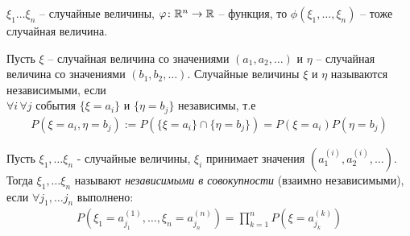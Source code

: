 \begin{remark}
	$\xi_1 \ldots \xi_n$ -- случайные величины, $\varphi\colon \mathbb{R}^n \to \mathbb{R}$ -- функция, 
	то $\phi(\xi_1, \ldots, \xi_n)$ -- тоже случайная величина.
\end{remark}

\begin{definition}
	Пусть $\xi$ -- случайная величина со значениями $(a_1, a_2, \ldots )$ и 
	$\eta$ -- случайная величина со значениями $(b_1, b_2, \ldots)$. 
	Случайные величины $\xi$ и $\eta$ называются независимыми, если\\
	$\forall i \, \forall j$ события $\{ \xi = a_i \}$ и  $\{ \eta = b_j \}$ независимы, т.е 
	\begin{align*}
		P(\xi = a_i, \eta = b_j) := P(\{ \xi = a_i \} \cap \{ \eta = b_j \}) = P(\xi = a_i) P(\eta = b_j)
	\end{align*}
\end{definition}

\begin{definition}
	Пусть $\xi_1, \ldots \xi_n$ - случайные величины, 
	$\xi_i$ принимает значения $(a_1^{(i)}, a_2^{(i)}, \ldots)$. 
	Тогда $\xi_1, \ldots \xi_n$ называют \emph{независимыми в совокупности} (взаимно независимыми), 
	если $\forall j_1, \ldots j_n$ выполнено:
	\begin{align*}
		P(\xi_1 = a_{j_1}^{(1)}, \ldots, \xi_n = a_{j_n}^{(n)}) = 
		\prod\limits_{k = 1}^n P(\xi = a_{j_k}^{(k)})
	\end{align*}
\end{definition}

